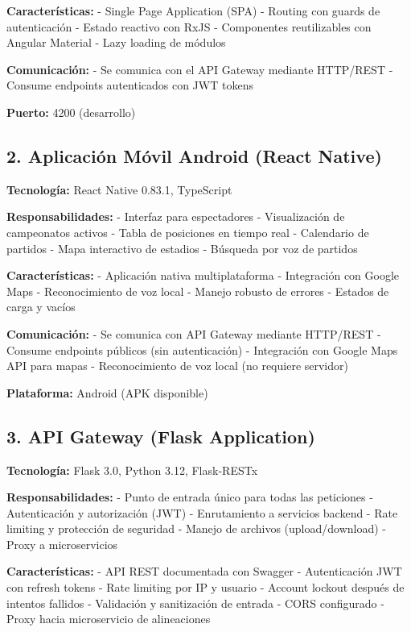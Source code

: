 \documentclass[
  spanish,
  11pt,
  letterpaper,
]{book}
\begin{document}
\textbf{Características:} - Single Page Application (SPA) - Routing con
guards de autenticación - Estado reactivo con RxJS - Componentes
reutilizables con Angular Material - Lazy loading de módulos

\textbf{Comunicación:} - Se comunica con el API Gateway mediante
HTTP/REST - Consume endpoints autenticados con JWT tokens

\textbf{Puerto:} 4200 (desarrollo)

\subsection{2. Aplicación Móvil Android (React
Native)}\label{aplicaciuxf3n-muxf3vil-android-react-native}

\textbf{Tecnología:} React Native 0.83.1, TypeScript

\textbf{Responsabilidades:} - Interfaz para espectadores - Visualización
de campeonatos activos - Tabla de posiciones en tiempo real - Calendario
de partidos - Mapa interactivo de estadios - Búsqueda por voz de
partidos

\textbf{Características:} - Aplicación nativa multiplataforma -
Integración con Google Maps - Reconocimiento de voz local - Manejo
robusto de errores - Estados de carga y vacíos

\textbf{Comunicación:} - Se comunica con API Gateway mediante HTTP/REST
- Consume endpoints públicos (sin autenticación) - Integración con
Google Maps API para mapas - Reconocimiento de voz local (no requiere
servidor)

\textbf{Plataforma:} Android (APK disponible)

\subsection{3. API Gateway (Flask
Application)}\label{api-gateway-flask-application}

\textbf{Tecnología:} Flask 3.0, Python 3.12, Flask-RESTx

\textbf{Responsabilidades:} - Punto de entrada único para todas las
peticiones - Autenticación y autorización (JWT) - Enrutamiento a
servicios backend - Rate limiting y protección de seguridad - Manejo de
archivos (upload/download) - Proxy a microservicios

\textbf{Características:} - API REST documentada con Swagger -
Autenticación JWT con refresh tokens - Rate limiting por IP y usuario -
Account lockout después de intentos fallidos - Validación y sanitización
de entrada - CORS configurado - Proxy hacia microservicio de
alineaciones
\end{document}
